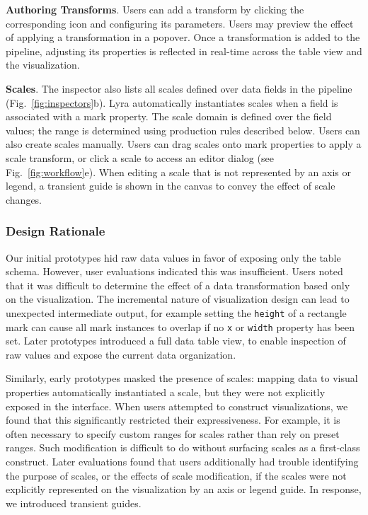 \textbf{Authoring Transforms}. Users can add a transform by clicking the
corresponding icon and configuring its parameters. Users may preview the effect
of applying a transformation in a popover. Once a transformation is added to the
pipeline, adjusting its properties is reflected in real-time across the table
view and the visualization.

\textbf{Scales}. The inspector also lists all scales defined over data fields in
the pipeline (Fig.~\ref{fig:inspectors}b). Lyra automatically instantiates
scales when a field is associated with a mark property. The scale domain is
defined over the field values; the range is determined using production rules
described below. Users can also create scales manually. Users can drag scales
onto mark properties to apply a scale transform, or click a scale to access an
editor dialog (see Fig.~\ref{fig:workflow}e). When editing a scale that is not
represented by an axis or legend, a transient guide is shown in the canvas to
convey the effect of scale changes.

\subsubsection{Design Rationale}

Our initial prototypes hid raw data values in favor of
exposing only the table schema. However, user evaluations indicated this was
insufficient. Users noted that it was difficult to determine the effect of a
data transformation based only on the visualization. The incremental nature of
visualization design can lead to unexpected intermediate output, for example
setting the \texttt{height} of a rectangle mark can cause all mark instances
to overlap if no \texttt{x} or \texttt{width} property has been set. Later
prototypes introduced a full data table view, to enable inspection of raw
values and expose the current data organization.

Similarly, early prototypes masked the presence of scales: mapping data to
visual properties automatically instantiated a scale, but they were not
explicitly exposed in the interface. When users attempted to construct
visualizations, we found that this significantly restricted their
expressiveness. For example, it is often necessary to specify custom ranges
for scales rather than rely on preset ranges. Such modification is difficult
to do without surfacing scales as a first-class construct. Later evaluations
found that users additionally had trouble identifying the purpose of scales,
or the effects of scale modification, if the scales were not explicitly
represented on the visualization by an axis or legend guide. In response, we
introduced transient guides.

